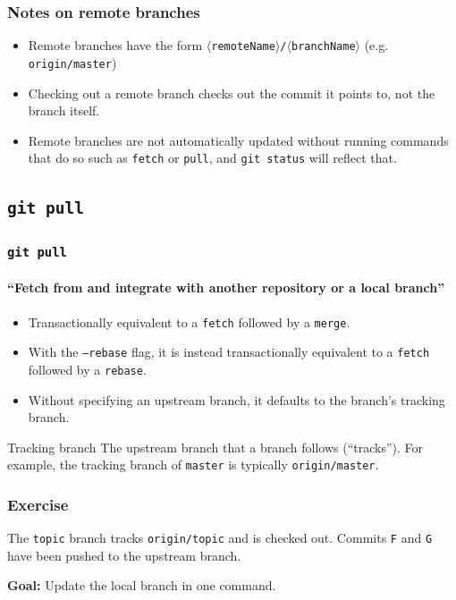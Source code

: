 \documentclass{beamer}
\newcommand\gitcmd[1]{\texttt{git #1}}
\newcommand\gitsubcmd[1]{\texttt{#1}}
\newcommand\gflag[1]{\texttt{#1}}
\newcommand\grefspec[1]{\texttt{#1}}
\newcommand\gbranch[1]{\texttt{#1}}
\newcommand\gremotebranch[1]{\texttt{#1}}
\newcommand\goal[1]{\textbf{Goal:} #1}
\begin{document}
\begin{frame}
  \frametitle{Notes on remote branches}
  \begin{itemize}
    \item Remote branches have the form \gremotebranch{$\langle$remoteName$\rangle$/$\langle$branchName$\rangle$} (e.g. \gremotebranch{origin/master})
    \item Checking out a remote branch checks out the commit it points to, not the branch itself.
    \item Remote branches are not automatically updated without running commands that do so such as \gitsubcmd{fetch} or \gitsubcmd{pull}, and \gitcmd{status} will reflect that.
  \end{itemize}
\end{frame}

\subsection{\gitcmd{pull}}

\begin{frame}
  \frametitle{\gitcmd{pull}}
  \framesubtitle{``Fetch from and integrate with another repository or a local branch''}
  \begin{itemize}
    \item Transactionally equivalent to a \gitsubcmd{fetch} followed by a \gitsubcmd{merge}.
    \item With the \gflag{--rebase} flag, it is instead transactionally equivalent to a \gitsubcmd{fetch} followed by a \gitsubcmd{rebase}.
    \item Without specifying an upstream branch, it defaults to the branch's tracking branch.
  \end{itemize}
  \vfill
  \begin{block}{Tracking branch}
    The upstream branch that a branch follows (``tracks''). For example, the tracking branch of \gbranch{master} is typically \gremotebranch{origin/master}.
  \end{block}
\end{frame}

\begin{frame}
  \frametitle{Exercise}
  The \gbranch{topic} branch tracks \gremotebranch{origin/topic} and is checked out. Commits \grefspec{F} and \grefspec{G} have been pushed to the upstream branch.

  \goal{Update the local branch in one command.}

  \begin{figure}
    \centering
  \end{figure}
\end{frame}
\end{document}
